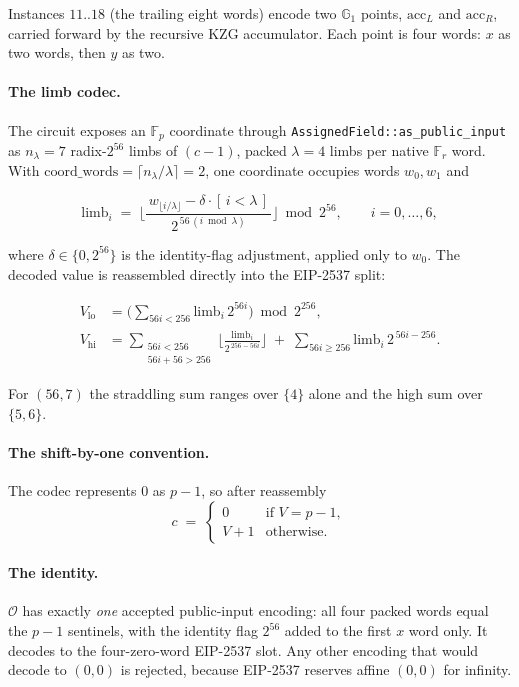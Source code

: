 \documentclass[11pt,a4paper]{article}
\newcommand{\Fr}{\ensuremath{\mathbb{F}_{r}}}
\newcommand{\Fp}{\ensuremath{\mathbb{F}_{p}}}
\newcommand{\Gone}{\ensuremath{\mathbb{G}_{1}}}
\newcommand{\Ident}{\ensuremath{\mathcal{O}}}
\newcommand{\code}[1]{\texttt{#1}}
\theoremstyle{definition}
\begin{document}
Instances $11..18$ (the trailing eight words) encode two $\Gone$ points,
$\mathrm{acc}_L$ and $\mathrm{acc}_R$, carried forward by the recursive KZG
accumulator. Each point is four words: $x$ as two words, then $y$ as two.

\paragraph{The limb codec.}
The circuit exposes an $\Fp$ coordinate through
\code{AssignedField::as\_public\_input} as $n_\lambda = 7$ radix-$2^{56}$
limbs of $(c-1)$, packed $\lambda = 4$ limbs per native $\Fr$ word. With
$\mathrm{coord\_words} = \lceil n_\lambda/\lambda \rceil = 2$, one coordinate
occupies words $w_0, w_1$ and

\begin{equation}
\mathrm{limb}_i \;=\;
\Big\lfloor \frac{\,w_{\lfloor i/\lambda\rfloor} - \delta\cdot[\,i<\lambda\,]\,}{2^{\,56\,(i \bmod \lambda)}} \Big\rfloor
\bmod 2^{56},
\qquad i = 0,\dots,6,
\end{equation}

where $\delta \in \{0, 2^{56}\}$ is the identity-flag adjustment, applied only
to $w_0$. The decoded value is reassembled directly into the EIP-2537 split:

\begin{align}
V_{\mathrm{lo}} &= \Big(\textstyle\sum_{56i < 256} \mathrm{limb}_i\, 2^{56 i}\Big) \bmod 2^{256}, \\
V_{\mathrm{hi}} &= \sum_{\substack{56i<256 \\ 56i+56>256}} \Big\lfloor \frac{\mathrm{limb}_i}{2^{\,256-56i}} \Big\rfloor
             \;+\; \sum_{56i \ge 256} \mathrm{limb}_i\, 2^{\,56i-256}.
\end{align}

For $(56,7)$ the straddling sum ranges over $\{4\}$ alone and the high sum over
$\{5,6\}$.

\paragraph{The shift-by-one convention.}
The codec represents $0$ as $p-1$, so after reassembly
\begin{equation}
c \;=\;
\begin{cases}
0 & \text{if } V = p-1, \\
V + 1 & \text{otherwise.}
\end{cases}
\end{equation}

\paragraph{The identity.}
$\Ident$ has exactly \emph{one} accepted public-input encoding: all four packed
words equal the $p-1$ sentinels, with the identity flag $2^{56}$ added to the
first $x$ word only. It decodes to the four-zero-word EIP-2537 slot. Any other
encoding that would decode to $(0,0)$ is rejected, because EIP-2537 reserves
affine $(0,0)$ for infinity.
\end{document}
